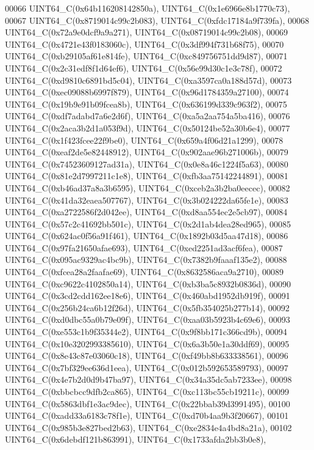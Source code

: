 \begin{DoxyCode}
00066     UINT64\_C(0x64b116208142850a), UINT64\_C(0x1e6966e8b1770c73),
00067     UINT64\_C(0x8719014c99c2b083), UINT64\_C(0xfdc17184a9f739fa),
00068     UINT64\_C(0x72a9e0dcf9a9a271), UINT64\_C(0x08719014c99c2b08),
00069     UINT64\_C(0x4721e43f0183060c), UINT64\_C(0x3df994f731b68f75),
00070     UINT64\_C(0xb29105af61e814fe), UINT64\_C(0xc849756751dd9d87),
00071     UINT64\_C(0x2c31edf8f1d64ef6), UINT64\_C(0x56e99d30c1e3c78f),
00072     UINT64\_C(0xd9810c6891bd5c04), UINT64\_C(0xa3597ca0a188d57d),
00073     UINT64\_C(0xec09088b6997f879), UINT64\_C(0x96d1784359a27100),
00074     UINT64\_C(0x19b9e91b09fcea8b), UINT64\_C(0x636199d339c963f2),
00075     UINT64\_C(0xdf7adabd7a6e2d6f), UINT64\_C(0xa5a2aa754a5ba416),
00076     UINT64\_C(0x2aca3b2d1a053f9d), UINT64\_C(0x50124be52a30b6e4),
00077     UINT64\_C(0x1f423fcee22f9be0), UINT64\_C(0x659a4f06d21a1299),
00078     UINT64\_C(0xeaf2de5e82448912), UINT64\_C(0x902aae96b271006b),
00079     UINT64\_C(0x74523609127ad31a), UINT64\_C(0x0e8a46c1224f5a63),
00080     UINT64\_C(0x81e2d7997211c1e8), UINT64\_C(0xfb3aa75142244891),
00081     UINT64\_C(0xb46ad37a8a3b6595), UINT64\_C(0xceb2a3b2ba0eecec),
00082     UINT64\_C(0x41da32eaea507767), UINT64\_C(0x3b024222da65fe1e),
00083     UINT64\_C(0xa2722586f2d042ee), UINT64\_C(0xd8aa554ec2e5cb97),
00084     UINT64\_C(0x57c2c41692bb501c), UINT64\_C(0x2d1ab4dea28ed965),
00085     UINT64\_C(0x624ac0f56a91f461), UINT64\_C(0x1892b03d5aa47d18),
00086     UINT64\_C(0x97fa21650afae693), UINT64\_C(0xed2251ad3acf6fea),
00087     UINT64\_C(0x095ac9329ac4bc9b), UINT64\_C(0x7382b9faaaf135e2),
00088     UINT64\_C(0xfcea28a2faafae69), UINT64\_C(0x8632586aca9a2710),
00089     UINT64\_C(0xc9622c4102850a14), UINT64\_C(0xb3ba5c8932b0836d),
00090     UINT64\_C(0x3cd2cdd162ee18e6), UINT64\_C(0x460abd1952db919f),
00091     UINT64\_C(0x256b24ca6b12f26d), UINT64\_C(0x5fb354025b277b14),
00092     UINT64\_C(0xd0dbc55a0b79e09f), UINT64\_C(0xaa03b5923b4c69e6),
00093     UINT64\_C(0xe553c1b9f35344e2), UINT64\_C(0x9f8bb171c366cd9b),
00094     UINT64\_C(0x10e3202993385610), UINT64\_C(0x6a3b50e1a30ddf69),
00095     UINT64\_C(0x8e43c87e03060c18), UINT64\_C(0xf49bb8b633338561),
00096     UINT64\_C(0x7bf329ee636d1eea), UINT64\_C(0x012b592653589793),
00097     UINT64\_C(0x4e7b2d0d9b47ba97), UINT64\_C(0x34a35dc5ab7233ee),
00098     UINT64\_C(0xbbcbcc9dfb2ca865), UINT64\_C(0xc113bc55cb19211c),
00099     UINT64\_C(0x5863dbf1e3ac9dec), UINT64\_C(0x22bbab39d3991495),
00100     UINT64\_C(0xadd33a6183c78f1e), UINT64\_C(0xd70b4aa9b3f20667),
00101     UINT64\_C(0x985b3e827bed2b63), UINT64\_C(0xe2834e4a4bd8a21a),
00102     UINT64\_C(0x6debdf121b863991), UINT64\_C(0x1733afda2bb3b0e8),

\end{DoxyCode}
